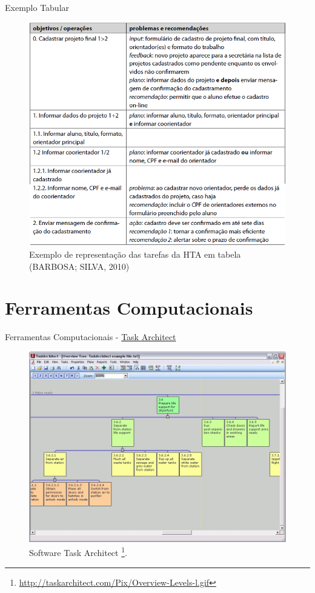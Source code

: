 \documentclass[xcolor=dvipsnames]{beamer}
\begin{document}
\begin{frame}{Exemplo Tabular}

	\begin{figure}[H]
    
		\centering
		\caption{Exemplo de representação das tarefas da HTA em tabela (BARBOSA; SILVA, 2010)}
		\label{fig:tabular}
		\includegraphics[width=0.6\linewidth]{img/tabular}
        
	\end{figure}

\end{frame}



\section{Ferramentas Computacionais}



\begin{frame}{Ferramentas Computacionais - \href{http://taskarchitect.com/products.html}{Task Architect}}
  
	\begin{figure}[H]
    
    	\centering
        \label{fig:taskarchitect}
        \includegraphics[width=0.7\linewidth]{img/taskarchitect.jpg}
        \caption{Software Task Architect \footnote{\url{http://taskarchitect.com/Pix/Overview-Levels-l.gif}}.}
        
	\end{figure}
    
\end{frame}
\end{document}
